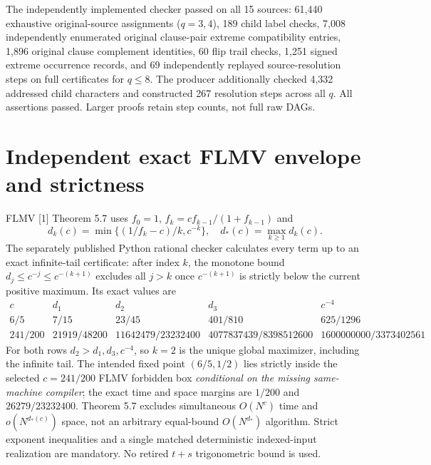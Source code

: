 \documentclass[11pt]{article}
\begin{document}
The independently implemented checker passed on all 15 sources: 61,440 exhaustive original-source assignments ($q=3,4$), 189 child label checks, 7,008 independently enumerated original clause-pair extreme compatibility entries, 1,896 original clause complement identities, 60 flip trail checks, 1,251 signed extreme occurrence records, and 69 independently replayed source-resolution steps on full certificates for $q\le8$. The producer additionally checked 4,332 addressed child characters and constructed 267 resolution steps across all $q$. All assertions passed. Larger proofs retain step counts, not full raw DAGs.

\section{Independent exact FLMV envelope and strictness}
FLMV [1] Theorem 5.7 uses $f_0=1$, $f_k=cf_{k-1}/(1+f_{k-1})$ and
\[
d_k(c)=\min\{(1/f_k-c)/k,c^{-k}\},\quad d_*(c)=\max_{k\ge1}d_k(c).
\]
The separately published Python rational checker calculates every term up to an exact infinite-tail certificate: after index $k$, the monotone bound $d_j\le c^{-j}\le c^{-(k+1)}$ excludes all $j>k$ once $c^{-(k+1)}$ is strictly below the current positive maximum. Its exact values are
\[
\begin{array}{c|c|c|c|c}
c&d_1&d_2&d_3&c^{-4}\\\hline
6/5&7/15&23/45&401/810&625/1296\\
241/200&21919/48200&11642479/23232400&
4077837439/8398512600&1600000000/3373402561
\end{array}
\]
For both rows $d_2>d_1,d_3,c^{-4}$, so $k=2$ is the unique global maximizer, including the infinite tail. The intended fixed point $(6/5,1/2)$ lies strictly inside the selected $c=241/200$ FLMV forbidden box \emph{conditional on the missing same-machine compiler}; the exact time and space margins are $1/200$ and $26279/23232400$. Theorem 5.7 excludes simultaneous $O(N^c)$ time and $o(N^{d_*(c)})$ space, not an arbitrary equal-bound $O(N^{d_*})$ algorithm. Strict exponent inequalities and a single matched deterministic indexed-input realization are mandatory. No retired $t+s$ trigonometric bound is used.
\end{document}
